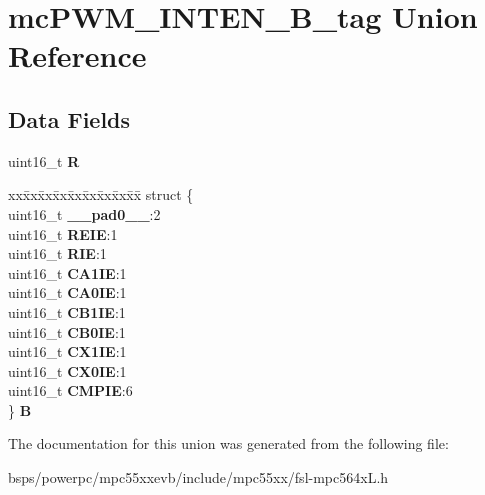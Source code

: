 \hypertarget{unionmcPWM__INTEN__16B__tag}{}\section{mc\+P\+W\+M\+\_\+\+I\+N\+T\+E\+N\+\_\+B\+\_\+tag Union Reference}
\label{unionmcPWM__INTEN__16B__tag}
\subsection*{Data Fields}
\begin{DoxyCompactItemize}
\item 
\mbox{\label{unionmcPWM__INTEN__16B__tag_ac5a110d58e3043f78783c421fc65ae59}} 
uint16\+\_\+t {\bfseries R}
\item 
\mbox{\label{unionmcPWM__INTEN__16B__tag_a7d5c4fec7b1e0cb16a132377e9d22c33}} 
\begin{tabbing}
xx\=xx\=xx\=xx\=xx\=xx\=xx\=xx\=xx\=\kill
struct \{\\
\>uint16\_t {\bfseries \_\_pad0\_\_}:2\\
\>uint16\_t {\bfseries REIE}:1\\
\>uint16\_t {\bfseries RIE}:1\\
\>uint16\_t {\bfseries CA1IE}:1\\
\>uint16\_t {\bfseries CA0IE}:1\\
\>uint16\_t {\bfseries CB1IE}:1\\
\>uint16\_t {\bfseries CB0IE}:1\\
\>uint16\_t {\bfseries CX1IE}:1\\
\>uint16\_t {\bfseries CX0IE}:1\\
\>uint16\_t {\bfseries CMPIE}:6\\
\} {\bfseries B}\\

\end{tabbing}\end{DoxyCompactItemize}


The documentation for this union was generated from the following file\+:\begin{DoxyCompactItemize}
\item 
bsps/powerpc/mpc55xxevb/include/mpc55xx/fsl-\/mpc564x\+L.\+h\end{DoxyCompactItemize}
